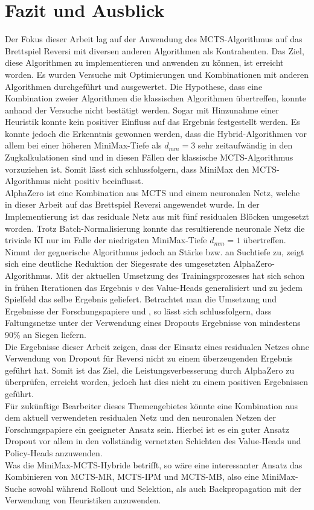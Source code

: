 \documentclass[12pt,a4paper,bibliography=totocnumbered,listof=totocnumbered]{article}
\begin{document}
\section{Fazit und Ausblick}
Der Fokus dieser Arbeit lag auf der Anwendung des MCTS-Algorithmus auf das Brettspiel Reversi mit diversen anderen Algorithmen als Kontrahenten. Das Ziel, diese Algorithmen zu implementieren und anwenden zu können, ist erreicht worden. Es wurden Versuche mit Optimierungen und Kombinationen mit anderen Algorithmen durchgeführt und ausgewertet. Die Hypothese, dass eine Kombination zweier Algorithmen die klassischen Algorithmen übertreffen, konnte anhand der Versuche nicht bestätigt werden. Sogar mit Hinzunahme einer Heuristik konnte kein positiver Einfluss auf das Ergebnis festgestellt werden. Es konnte jedoch die Erkenntnis gewonnen werden, dass die Hybrid-Algorithmen vor allem bei einer höheren MiniMax-Tiefe als $d_{mm}=3$ sehr zeitaufwändig in den Zugkalkulationen sind und in diesen Fällen der klassische MCTS-Algorithmus vorzuziehen ist. Somit lässt sich schlussfolgern, dass MiniMax den MCTS-Algorithmus nicht positiv beeinflusst.\\
AlphaZero ist eine Kombination aus MCTS und einem neuronalen Netz, welche in dieser Arbeit auf das Brettspiel Reversi angewendet wurde. In der Implementierung ist das residuale Netz aus \cite{Silver.2017} mit fünf residualen Blöcken umgesetzt worden. Trotz Batch-Normalisierung konnte das resultierende neuronale Netz die triviale KI nur im Falle der niedrigsten MiniMax-Tiefe $d_{mm}=1$ übertreffen. Nimmt der gegnerische Algorithmus jedoch an Stärke bzw. an Suchtiefe zu, zeigt sich eine deutliche Reduktion der Siegesrate des umgesetzten AlphaZero-Algorithmus. Mit der aktuellen Umsetzung des Trainingsprozesses hat sich schon in frühen Iterationen das Ergebnis $v$ des Value-Heads generalisiert und zu jedem Spielfeld das selbe Ergebnis geliefert. Betrachtet man die Umsetzung und Ergebnisse der Forschungspapiere \cite{Shantanu.2018} und \cite{Liskowski.2018}, so lässt sich schlussfolgern, dass Faltungsnetze unter der Verwendung eines Dropouts Ergebnisse von mindestens 90\% an Siegen liefern.\\
Die Ergebnisse dieser Arbeit zeigen, dass der Einsatz eines residualen Netzes ohne Verwendung von Dropout für Reversi nicht zu einem überzeugenden Ergebnis geführt hat. Somit ist das Ziel, die Leistungsverbesserung durch AlphaZero zu überprüfen, erreicht worden, jedoch hat dies nicht zu einem positiven Ergebnissen geführt.\\
Für zukünftige Bearbeiter dieses Themengebietes könnte eine Kombination aus dem aktuell verwendeten residualen Netz und den neuronalen Netzen der Forschungspapiere ein geeigneter Ansatz sein. Hierbei ist es ein guter Ansatz Dropout vor allem in den vollständig vernetzten Schichten des Value-Heads und Policy-Heads anzuwenden.\\
Was die MiniMax-MCTS-Hybride betrifft, so wäre eine interessanter Ansatz das Kombinieren von MCTS-MR, MCTS-IPM und MCTS-MB, also eine MiniMax-Suche sowohl während Rollout und Selektion, als auch Backpropagation mit der Verwendung von Heuristiken anzuwenden.\\
\end{document}
